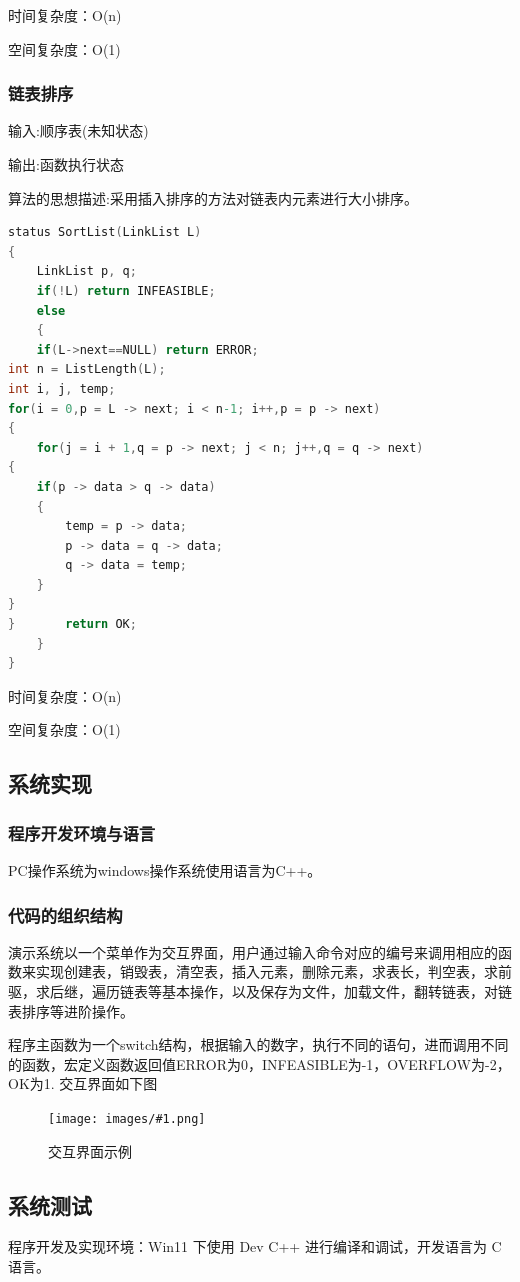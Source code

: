 \documentclass[supercite]{Experimental_Report}
\newcommand{\cfig}[3]{
	\begin{figure}[htb]
		\centering
		\texttt{[image: images/\#1.png]}
		\caption{#3}
		\label{fig:#1}
	\end{figure}
}
\theoremstyle{definition}
\begin{document}
时间复杂度：O(n)

空间复杂度：O(1)

\subsubsection{链表排序}
输入:顺序表(未知状态)

输出:函数执行状态

算法的思想描述:采用插入排序的方法对链表内元素进行大小排序。	
\begin{lstlisting}[language=C] 
	status SortList(LinkList L)
{
	LinkList p, q;
	if(!L) return INFEASIBLE;
	else
	{
	if(L->next==NULL) return ERROR;
int n = ListLength(L);
int i, j, temp;
for(i = 0,p = L -> next; i < n-1; i++,p = p -> next)
{
	for(j = i + 1,q = p -> next; j < n; j++,q = q -> next)
{
	if(p -> data > q -> data)
	{
		temp = p -> data;
		p -> data = q -> data;
		q -> data = temp;
	}
}
}		return OK;
	}	
}
\end{lstlisting}
时间复杂度：O(n)

空间复杂度：O(1)
\subsection{系统实现}
\subsubsection{程序开发环境与语言}
PC操作系统为windows操作系统使用语言为C++。
\subsubsection{代码的组织结构}
演示系统以一个菜单作为交互界面，用户通过输入命令对应的编号来调用相应的函数来实现创建表，销毁表，清空表，插入元素，删除元素，求表长，判空表，求前驱，求后继，遍历链表等基本操作，以及保存为文件，加载文件，翻转链表，对链表排序等进阶操作。


程序主函数为一个switch结构，根据输入的数字，执行不同的语句，进而调用不同的函数，宏定义函数返回值ERROR为0，INFEASIBLE为-1，OVERFLOW为-2，OK为1.
交互界面如下图
\cfig{1.3.1}{0.8}{交互界面示例}
\newpage
\subsection{系统测试}
程序开发及实现环境：Win11 下使用 Dev C++ 进行编译和调试，开发语言为 C 语言。
\end{document}
